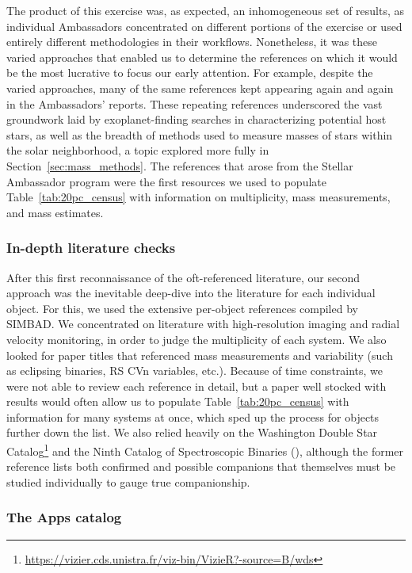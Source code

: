 \documentclass[twocolumn,tighten,twocolappendix]{aastex631}
\begin{document}
The product of this exercise was, as expected, an inhomogeneous set of results, as individual Ambassadors concentrated on different portions of the exercise or used entirely different methodologies in their workflows. Nonetheless, it was these varied approaches that enabled us to determine the references on which it would be the most lucrative to focus our early attention. For example, despite the varied approaches, many of the same references kept appearing again and again in the Ambassadors' reports. These repeating references underscored the vast groundwork laid by exoplanet-finding searches in characterizing potential host stars, as well as the breadth of methods used to measure masses of stars within the solar neighborhood, a topic explored more fully in Section~\ref{sec:mass_methods}. The references that arose from the Stellar Ambassador program were the first resources we used to populate Table~\ref{tab:20pc_census}
with information on multiplicity, mass measurements, and mass estimates.

\subsubsection{In-depth literature checks}

After this first reconnaissance of the oft-referenced literature, our second approach was the inevitable deep-dive into the literature for each individual object. For this, we used the extensive per-object references compiled by SIMBAD. We concentrated on literature with high-resolution imaging and radial velocity monitoring, in order to judge the multiplicity of each system. We also looked for paper titles that referenced mass measurements and variability (such as eclipsing binaries, RS CVn variables, etc.). Because of time constraints, we were not able to review each reference in detail, but a paper well stocked with results would often allow us to populate Table~\ref{tab:20pc_census} with information for many systems at once, which sped up the process for objects further down the list. We also relied heavily on the Washington Double Star Catalog\footnote{\url {https://vizier.cds.unistra.fr/viz-bin/VizieR?-source=B/wds}} and the Ninth Catalog of Spectroscopic Binaries (\citealt{pourbaix2009}), although the former reference lists both confirmed and possible companions that themselves must be studied individually to gauge true companionship. 

\subsubsection{The Apps catalog\label{sec:apps_catalog}}
\end{document}
